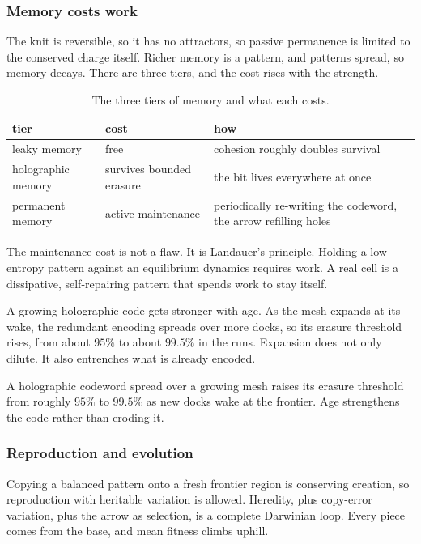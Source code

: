 \subsubsection{Memory costs work}

The knit is reversible, so it has no attractors, so passive permanence is limited to the conserved charge itself. Richer memory is a pattern, and patterns spread, so memory decays. There are three tiers, and the cost rises with the strength.

\begin{table}[ht]
\centering
\begin{tabular}{@{}lll@{}}
\toprule
tier & cost & how \\
\midrule
leaky memory & free & cohesion roughly doubles survival \\
holographic memory & survives bounded erasure & the bit lives everywhere at once \\
permanent memory & active maintenance & periodically re-writing the codeword, the arrow refilling holes \\
\bottomrule
\end{tabular}
\caption{The three tiers of memory and what each costs.}
\label{tab:memory-tiers}
\end{table}

The maintenance cost is not a flaw. It is Landauer's principle. Holding a low-entropy pattern against an equilibrium dynamics requires work. A real cell is a dissipative, self-repairing pattern that spends work to stay itself.

A growing holographic code gets stronger with age. As the mesh expands at its wake, the redundant encoding spreads over more docks, so its erasure threshold rises, from about $95\%$ to about $99.5\%$ in the runs. Expansion does not only dilute. It also entrenches what is already encoded.

\begin{result}
A holographic codeword spread over a growing mesh raises its erasure threshold from roughly $95\%$ to $99.5\%$ as new docks wake at the frontier. Age strengthens the code rather than eroding it.
\end{result}

\subsubsection{Reproduction and evolution}

Copying a balanced pattern onto a fresh frontier region is conserving creation, so reproduction with heritable variation is allowed. Heredity, plus copy-error variation, plus the arrow as selection, is a complete Darwinian loop. Every piece comes from the base, and mean fitness climbs uphill.

